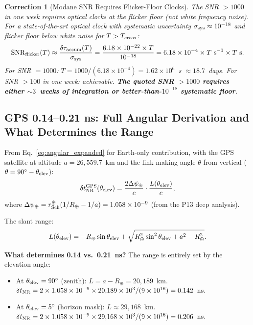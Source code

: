 \documentclass[aps,prd,twocolumn,superscriptaddress,nofootinbib]{revtex4-2}
\newcommand{\SNR}{\mathrm{SNR}}
\newcommand{\Rearth}{R_\oplus}
\newcommand{\rSch}{r_{\rm Sch}}
\newtheorem{correction}{Correction}
\begin{document}
\begin{correction}[Modane SNR Requires Flicker-Floor Clocks]
\label{cor:snr}
The SNR $> 1000$ in one week requires optical clocks at the flicker floor
(not white frequency noise).  For a state-of-the-art optical clock with
systematic uncertainty $\sigma_{\rm sys} \approx 10^{-18}$ and flicker
floor below white noise for $T > T_{\rm cross}$:
\begin{equation}
\SNR_{\rm flicker}(T) \approx \frac{\delta\tau_{\rm accum}(T)}{\sigma_{\rm sys}}
= \frac{6.18\times 10^{-22}\times T}{10^{-18}}
= 6.18\times 10^{-4}\times T~\text{s}^{-1}\times T~\text{s}.
\end{equation}
For SNR $= 1000$: $T = 1000/(6.18\times 10^{-4}) = 1.62\times 10^6$~s
$\approx 18.7$~days.  For SNR $> 100$ in one week: achievable.
\textbf{The quoted SNR $> 1000$ requires either $\sim 3$~weeks of
integration or better-than-$10^{-18}$ systematic floor}.
\end{correction}

\subsection{GPS 0.14--0.21 ns: Full Angular Derivation and What Determines
the Range}
\label{sec:gps_range}

From Eq.~\eqref{eq:angular_expanded} for Earth-only contribution, with
the GPS satellite at altitude $a = 26{,}559.7$~km and the link making
angle $\theta$ from vertical ($\theta = 90^\circ - \theta_{\rm elev}$):
\begin{equation}
\delta t_{\rm NR}^{\rm GPS}(\theta_{\rm elev})
= \frac{2\Delta\psi_\oplus}{c}\cdot\frac{L(\theta_{\rm elev})}{c},
\end{equation}
where $\Delta\psi_\oplus = \rSch^\oplus(1/\Rearth - 1/a) = 1.058\times 10^{-9}$
(from the P13 deep analysis).

The slant range:
\begin{equation}
L(\theta_{\rm elev}) = -\Rearth\sin\theta_{\rm elev}
+ \sqrt{\Rearth^2\sin^2\theta_{\rm elev} + a^2 - \Rearth^2}.
\end{equation}

\textbf{What determines 0.14 vs.\ 0.21~ns?}
The range is entirely set by the elevation angle:
\begin{itemize}
\item At $\theta_{\rm elev} = 90^\circ$ (zenith): $L = a - \Rearth = 20{,}189$~km.
  $\delta t_{\rm NR} = 2\times 1.058\times 10^{-9}\times 20{,}189\times 10^3/(9\times 10^{16})
  = 0.142$~ns.
\item At $\theta_{\rm elev} = 5^\circ$ (horizon mask): $L \approx 29{,}168$~km.
  $\delta t_{\rm NR} = 2\times 1.058\times 10^{-9}\times 29{,}168\times 10^3/(9\times 10^{16})
  = 0.206$~ns.
\end{itemize}
\end{document}
